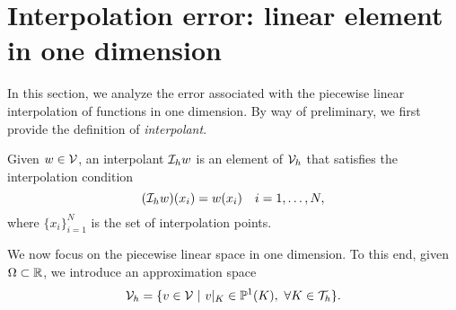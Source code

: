 \section{Interpolation error: linear element in one dimension}
\label{sec:fe_interp_1d}
In this section, we analyze the error associated with the piecewise linear interpolation of functions in one dimension. By way of preliminary, we first provide the definition of \emph{interpolant}.
\begin{definition}[interpolant]
Given $w \in \mathcal{V}$, an interpolant $\mathcal{I}_h w$ is an element of $\mathcal{V}_h$ that satisfies the interpolation condition
\begin{equation*}
  (\mathcal{I}_h w)(x_i) = w(x_i) \quad i = 1,\dots, N,
\end{equation*}
where $\{x_i \}_{i=1}^N$ is the set of interpolation points.
\end{definition}

We now focus on the piecewise linear space in one dimension.  To this end, given $\Omega \subset \mathbb{R}$, we introduce an approximation space
\begin{equation*}
  \mathcal{V}_h = \{ v \in \mathcal{V} \ | \ v|_K \in \mathbb{P}^1(K), \ \forall K \in \mathcal{T}_h \}.
\end{equation*}

